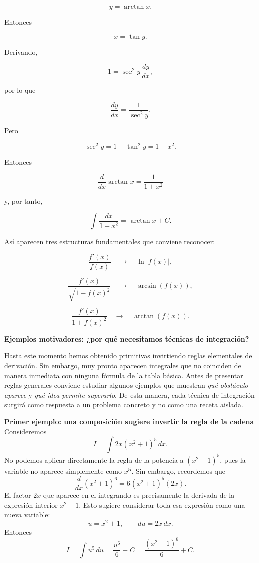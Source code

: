 \documentclass[12pt]{article}
\theoremstyle{definition}
\theoremstyle{remark}
\begin{document}
\[
y=\arctan x.
\]

Entonces

\[
x=\tan y.
\]

Derivando,

\[
1=\sec^2y\,\frac{dy}{dx},
\]

por lo que

\[
\frac{dy}{dx}
=
\frac1{\sec^2y}.
\]

Pero

\[
\sec^2y
=
1+\tan^2y
=
1+x^2.
\]

Entonces

\[
\boxed{
\frac{d}{dx}\arctan x
=
\frac1{1+x^2}
}
\]

y, por tanto,

\[
\boxed{
\int\frac{dx}{1+x^2}
=
\arctan x+C.
}
\]

Así aparecen tres estructuras fundamentales que conviene reconocer:

\[
\boxed{\frac{f'(x)}{f(x)}}
\quad\longrightarrow\quad
\ln|f(x)|,
\]

\[
\boxed{\frac{f'(x)}{\sqrt{1-f(x)^2}}}
\quad\longrightarrow\quad
\arcsin(f(x)),
\]

\[
\boxed{\frac{f'(x)}{1+f(x)^2}}
\quad\longrightarrow\quad
\arctan(f(x)).
\]



\textbf{Ejemplos motivadores: ¿por qué necesitamos técnicas de integración?}

Hasta este momento hemos obtenido primitivas invirtiendo reglas elementales de derivación. Sin embargo, muy pronto aparecen integrales que no coinciden de manera inmediata con ninguna fórmula de la tabla básica. Antes de presentar reglas generales conviene estudiar algunos ejemplos que muestran \emph{qué obstáculo aparece} y \emph{qué idea permite superarlo}. De esta manera, cada técnica de integración surgirá como respuesta a un problema concreto y no como una receta aislada.

\textbf{Primer ejemplo: una composición sugiere invertir la regla de la cadena}
Consideremos
\[
I=\int 2x(x^2+1)^5\,dx.
\]
No podemos aplicar directamente la regla de la potencia a $(x^2+1)^5$, pues la variable no aparece simplemente como $x^5$. Sin embargo, recordemos que
\[
\frac{d}{dx}(x^2+1)^6=6(x^2+1)^5(2x).
\]
El factor $2x$ que aparece en el integrando es precisamente la derivada de la expresión interior $x^2+1$. Esto sugiere considerar toda esa expresión como una nueva variable:
\[
u=x^2+1,\qquad du=2x\,dx.
\]
Entonces
\[
I=\int u^5\,du=\frac{u^6}{6}+C
=\boxed{\frac{(x^2+1)^6}{6}+C}.
\]
\end{document}
